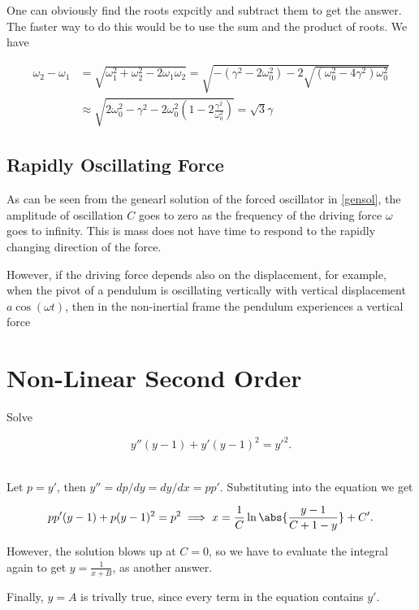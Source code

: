 \documentclass[english,a4paper,12pt]{report}
\begin{document}
One can obviously find the roots expcitly and subtract them to get the answer. The faster way to do this would be to use the sum and the product of roots. We have

\begin{equation}
    \begin{aligned} 
    \omega _{2} - \omega _{1} &= \sqrt{\omega _{1}^2+\omega _{2}^2-2\omega _{1}\omega _{2}} = \sqrt{-(\gamma ^2-2\omega _{0}^2 ) -2 \sqrt{(\omega _{0}^2 - 4\gamma ^2 )\omega _{0}^2 } } \\ &\approx \sqrt{2\omega _{0}^2 -\gamma ^2 - 2\omega _{0}^2 \left( 1 -2\frac{\gamma ^2}{\omega _{0}^2 }  \right)  } = \sqrt{3}\gamma  
    \end{aligned} 
\end{equation}

\subsection{Rapidly Oscillating Force}

As can be seen from the genearl solution of the forced oscillator in \cref{gensol}, the amplitude of oscillation \(C\) goes to zero as the frequency of the driving force \(\omega \) goes to infinity. This is mass does not have time to respond to the rapidly changing direction of the force. 

However, if the driving force depends also on the displacement, for example, when the pivot of a pendulum is oscillating vertically with vertical displacement \(a \cos (\omega t)\), then in the non-inertial frame the pendulum experiences a vertical force   



\section{Non-Linear Second Order}

{Solve 

\begin{equation}
    y''(y-1)+y'(y-1)^2=y'^2.
\end{equation}~
}
{Let \(p = y'\), then \( y''= dp /dy = dy /dx = p p'  \). Substituting into the equation we get

\begin{equation}
    p p' (y-1) + p(y-1)^2 = p^2 \implies x = \frac{1}{C} \ln \abs{\frac{y-1}{C+1-y} } +C'. 
\end{equation}

However, the solution blows up at \(C = 0\), so we have to evaluate the integral again to get \(y = \frac{1}{x+B} \), as another answer. 

Finally, \(y = A\) is trivally true, since every term in the equation contains \(y'\). 
}
\end{document}
